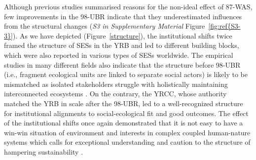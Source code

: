 Although previous studies summarised reasons for the non-ideal effect of 87-WAS, few improvements in the 98-UBR indicate that they underestimated influences from the structural changes (\textit{S3 in Supplementary Material} Figure~\ref{fig:ref{S3-3}}).
As we have depicted (Figure~\ref{structure}), the institutional shifts twice framed the structure of SESs in the YRB and led to different building blocks, which were also reported in various types of SESs worldwide.
The empirical studies in many different fields also indicate that the structure before 98-UBR (i.e., fragment ecological units are linked to separate social actors) is likely to be mismatched as isolated stakeholders struggle with holistically maintaining interconnected ecosystems
\cite{sayles2017,sayles2019,cai2016,bergsten2019}.
On the contrary, the YRCC, whose authority matched the YRB in scale after the 98-UBR, led to a well-recognized structure for institutional alignments to social-ecological fit and good outcomes.
The effect of the institutional shifts once again demonstrated that it is not easy to have a win-win situation of environment and interests in complex coupled human-nature systems \cite{hegwood2022} which calls for exceptional understanding and caution to the structure of hampering sustainability \cite{bergsten2019, sayles2019}.

